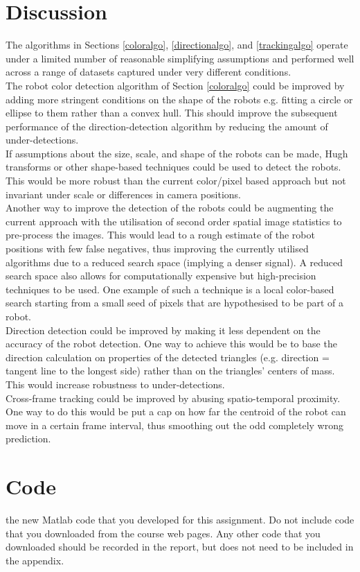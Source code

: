 \documentclass[10pt,a4paper]{article}
\begin{document}
\section{Discussion}\label{discussion}
The algorithms in Sections \ref{coloralgo}, \ref{directionalgo}, and 
\ref{trackingalgo} operate under a limited number of reasonable simplifying
assumptions and performed well across a range of datasets captured under very
different conditions.\\
The robot color detection algorithm of Section \ref{coloralgo} could be improved
by adding more stringent conditions on the shape of the robots e.g. fitting a
circle or ellipse to them rather than a convex hull. This should improve the
subsequent performance of the direction-detection algorithm by reducing the
amount of under-detections.\\
If assumptions about the size, scale, and shape of the robots can be made, Hugh 
transforms or other shape-based techniques could be used to detect the robots.
This would be more robust than the current color/pixel based approach but not 
invariant under scale or differences in camera positions.\\
Another way to improve the detection of the robots could be augmenting the
current approach with the utilisation of second order spatial image statistics
to pre-process the images. This would lead to a rough estimate of the robot
positions with few false negatives, thus improving the currently utilised
algorithms due to a reduced search space (implying a denser signal). A reduced
search space also allows for computationally expensive but high-precision 
techniques to be used. One example of such a technique is a local color-based
search starting from a small seed of pixels that are hypothesised to be part of
a robot.\\
Direction detection could be improved by making it less dependent on the
accuracy of the robot detection. One way to achieve this would be to base the 
direction calculation on properties of the detected triangles (e.g. direction =
tangent line to the longest side) rather than on the triangles' centers of 
mass. This would increase robustness to under-detections.\\
Cross-frame tracking could be improved by abusing spatio-temporal proximity. One
way to do this would be put a cap on how far the centroid of the robot can move 
in a certain frame interval, thus smoothing out the odd completely wrong 
prediction.


\section{Code}\label{code}
the new Matlab code that you developed for this assignment. Do not
include code that you downloaded from the course web pages. Any other code
that you downloaded should be recorded in the report, but does not need to
be included in the appendix.
\end{document}
